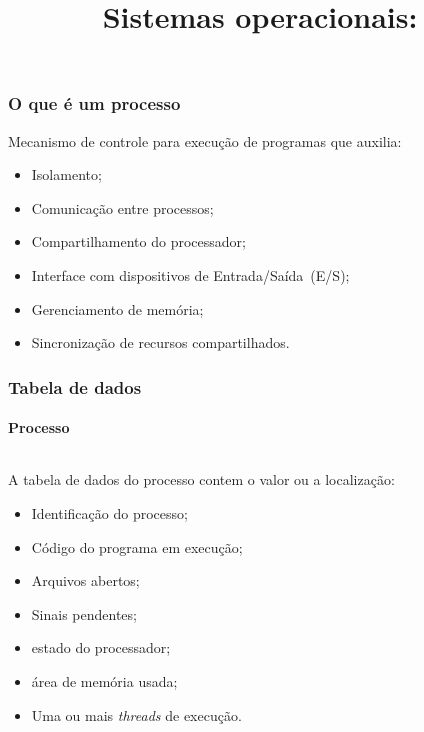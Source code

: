 

\title{Sistemas operacionais: \insertlecture}
\frame{\titlepage}

\section{\insertlecture}

\begin{frame}
\frametitle{O que é um processo}
Mecanismo de controle para execução de programas que auxilia:
\begin{itemize}
\item Isolamento;
\item Comunicação entre processos;
\item Compartilhamento do processador;
\item Interface com dispositivos de Entrada/Saída~(E/S);
\item Gerenciamento de memória;
\item Sincronização de recursos compartilhados.
\end{itemize}
\end{frame}

\begin{frame}\frametitle{Tabela de dados}
  \framesubtitle{Processo}
\begin{columns}
\begin{column}{6cm}
\begin{small}
A tabela de dados do processo contem o valor ou a localização:
\begin{itemize}
\item Identificação do processo;
\item Código do programa em execução;
\item Arquivos abertos;
\item Sinais pendentes;
\item estado do processador;
\item área de memória usada;
\item Uma ou mais {\em threads} de execução.
\end{itemize}
\end{small}
\end{column}

\end{columns}
\end{frame}

